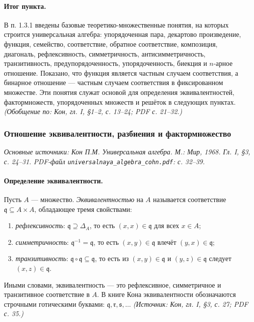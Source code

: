 \documentclass[a4paper,12pt]{article}
\begin{document}
\paragraph{Итог пункта.}
В п. 1.3.1 введены базовые теоретико-множественные понятия, на которых строится универсальная алгебра: упорядоченная пара, декартово произведение, функция, семейство, соответствие, обратное соответствие, композиция, диагональ, рефлексивность, симметричность, антисимметричность, транзитивность, предупорядоченность, упорядоченность, биекция и \(n\)-арное отношение. Показано, что функция является частным случаем соответствия, а бинарное отношение — частным случаем соответствия в фиксированном множестве. Эти понятия служат основой для определения эквивалентностей, фактормножеств, упорядоченных множеств и решёток в следующих пунктах.
\textit{(Обобщение по: Кон, гл. I, §1--2, с. 13--24; PDF с. 21--32.)}

\subsubsection{Отношение эквивалентности, разбиения и фактормножество}

\noindent\textit{Основные источники: Кон П.М. Универсальная алгебра. М.: Мир, 1968. Гл. I, §3, с. 24--31. PDF-файл \texttt{universalnaya\_algebra\_cohn.pdf}: с. 32--39.}

\paragraph{Определение эквивалентности.}
Пусть \(A\) — множество. \emph{Эквивалентностью} на \(A\) называется соответствие \(\mathfrak{q}\subseteq A\times A\), обладающее тремя свойствами:
\begin{enumerate}[label=(\arabic*)]
\item \emph{рефлексивность}: \(\mathfrak{q}\supseteq\Delta_A\), то есть \((x,x)\in\mathfrak{q}\) для всех \(x\in A\);
\item \emph{симметричность}: \(\mathfrak{q}^{-1}=\mathfrak{q}\), то есть \((x,y)\in\mathfrak{q}\) влечёт \((y,x)\in\mathfrak{q}\);
\item \emph{транзитивность}: \(\mathfrak{q}\circ\mathfrak{q}\subseteq\mathfrak{q}\), то есть из \((x,y)\in\mathfrak{q}\) и \((y,z)\in\mathfrak{q}\) следует \((x,z)\in\mathfrak{q}\).
\end{enumerate}
Иными словами, эквивалентность — это рефлексивное, симметричное и транзитивное соответствие в \(A\). В книге Кона эквивалентности обозначаются строчными готическими буквами: \(\mathfrak{q},\mathfrak{r},\mathfrak{s},\ldots\)
\textit{(Источник: Кон, гл. I, §3, с. 27; PDF с. 35.)}
\end{document}
